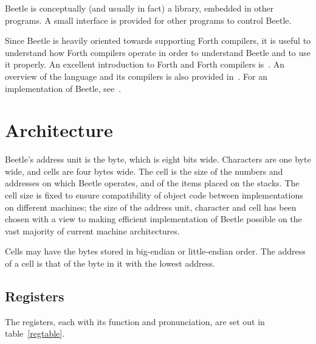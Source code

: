 \documentclass{article}
\newlength{\pronunc}\pronunc=1.7in
\begin{document}
Beetle is conceptually (and usually in fact) a library, embedded in other programs.
A small interface is provided for other programs to control Beetle.

Since Beetle is heavily oriented towards supporting Forth compilers, it is
useful to understand how Forth compilers operate in order to understand Beetle
and to use it properly. An excellent introduction to Forth and Forth compilers
is~\cite{starting4th}. An overview of the language and its compilers is also
provided in~\cite{ANSIforth}. For an implementation of Beetle, see~\cite{cbeetle}.


\section{Architecture}

Beetle's address unit is the byte, which is eight bits wide. Characters are one
byte wide, and cells are four bytes wide. The cell is the size of the numbers
and addresses on which Beetle operates, and of the items placed on the stacks.
The cell size is fixed to ensure compatibility of object code between
implementations on different machines; the size of the address unit, character
and cell has been chosen with a view to making efficient implementation of
Beetle possible on the vast majority of current machine architectures.

Cells may have the bytes stored in big-endian or little-endian order. The
address of a cell is that of the byte in it with the lowest address.


\subsection{Registers}
\label{registers}

The registers, each with its function and pronunciation, are set out in table~\ref{regtable}.
\end{document}
